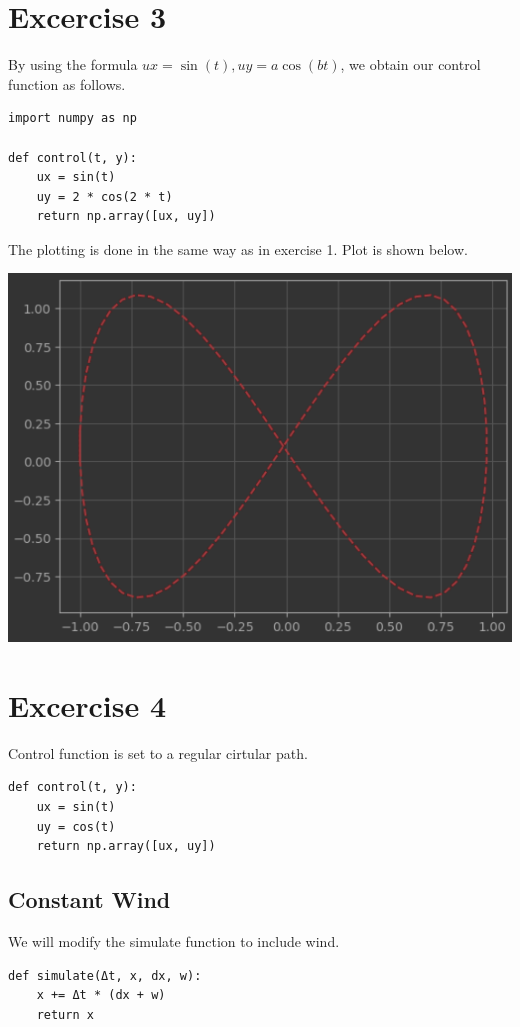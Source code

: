 \documentclass[letterpaper, 10 pt, conference]{ieeeconf}  %
\begin{document}
    \section{Excercise 3}
    By using the formula $ux = \sin(t), uy = a\cos(bt)$, we obtain our control function as follows.
    \begin{lstlisting}[label={lst:lstlisting4}]
import numpy as np

def control(t, y):
    ux = sin(t)
    uy = 2 * cos(2 * t)
    return np.array([ux, uy])
    \end{lstlisting}
    The plotting is done in the same way as in exercise 1.
    Plot is shown below.
    \begin{center}
        \includegraphics[scale=0.4]{exercise-2}
    \end{center}


    \section{Excercise 4}
    Control function is set to a regular cirtular path.
    \begin{lstlisting}[label={lst:lstlisting5}]
def control(t, y):
    ux = sin(t)
    uy = cos(t)
    return np.array([ux, uy])
    \end{lstlisting}

    \subsection{Constant Wind}
    We will modify the simulate function to include wind.
    \begin{lstlisting}[label={lst:lstlistin6}]
def simulate(Δt, x, dx, w):
    x += Δt * (dx + w)
    return x
    \end{lstlisting}
\end{document}
